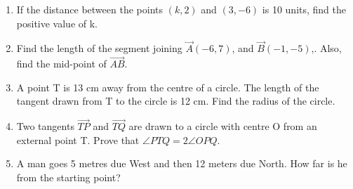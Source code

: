 \documentclass{article}
\begin{document}
\begin{enumerate}
\item  If the distance between the points $(k, 2)$ and $(3,-6)$ is 10 units, find the positive value of k. 
			
\item  Find the length of the segment joining $\vec{A}(-6, 7)$, and $\vec{B}(-1, -5)$,. Also, find the mid-point of $ \vec{AB} $. 
	
\item  A point T is 13 cm away from the centre of a circle. The length of the tangent drawn from T to the circle is 12 cm. Find the radius of the circle. 
	
\item  Two tangents $ \vec{TP} $ and $ \vec{TQ} $ are drawn to a circle with centre O from an external point T. Prove that $\angle PTQ= 2 \angle OPQ$. 

\item  A man goes 5 metres due West and then 12 meters due North. How far is he from the starting point?


\end{enumerate}
\end{document}
